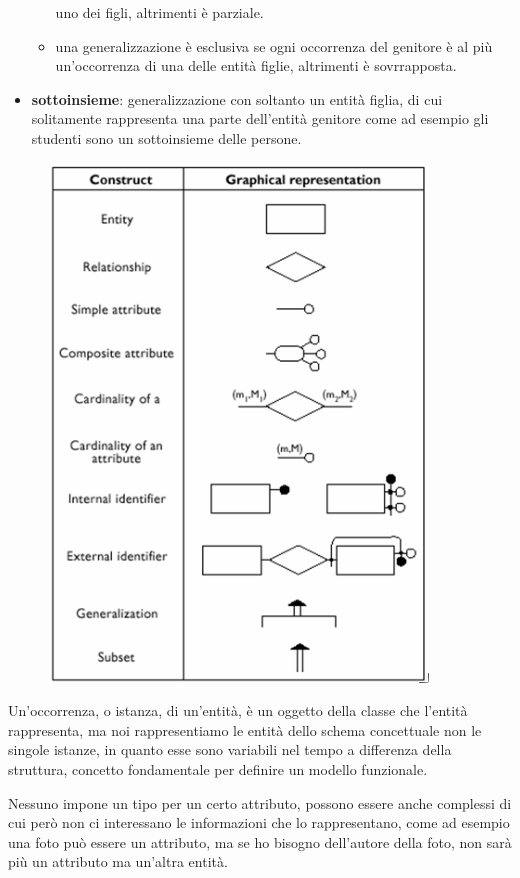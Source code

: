 \documentclass[a4paper,12pt, oneside]{book}
\begin{document}
\begin{itemize}
\begin{itemize}
		            uno dei figli, altrimenti è parziale.
		      \item una generalizzazione è esclusiva se ogni occorrenza del genitore è al più un'occorrenza
		            di una delle entità figlie, altrimenti è sovrrapposta.
	      \end{itemize}
	\item \textbf{sottoinsieme}: generalizzazione con soltanto un entità figlia, di cui solitamente rappresenta una parte
	      dell'entità genitore come ad esempio gli studenti sono un sottoinsieme delle persone.
\end{itemize}

\begin{figure}
	\includegraphics[scale=0.8]{img/bas6.png}
\end{figure}
Un'occorrenza, o istanza, di un'entità, è un oggetto della classe che l'entità rappresenta,
ma noi rappresentiamo le entità dello schema concettuale non le singole istanze, in quanto esse
sono variabili nel tempo a differenza della struttura, concetto fondamentale per definire un modello funzionale.

Nessuno impone un tipo per un certo attributo, possono essere anche complessi di cui però non ci interessano le informazioni
che lo rappresentano, come ad esempio una foto può essere un attributo, ma se ho bisogno dell'autore della foto,
non sarà più un attributo ma un'altra entità.
\end{document}
